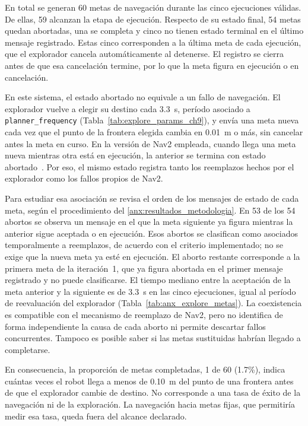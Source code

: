 En total se generan 60 metas de navegación durante las cinco ejecuciones
válidas. De ellas, 59 alcanzan la etapa de ejecución. Respecto de su estado
final, 54 metas quedan abortadas, una se completa y cinco no tienen estado
terminal en el último mensaje registrado. Estas cinco corresponden a la última
meta de cada ejecución, que el explorador cancela automáticamente al detenerse.
El registro se cierra antes de que esa cancelación termine, por lo que la meta
figura en ejecución o en cancelación.

En este sistema, el estado abortado no equivale a un fallo de navegación. El
explorador vuelve a elegir su destino cada 3.3~s, período asociado a
\texttt{planner\_frequency} (Tabla~\ref{tab:explore_params_ch9}), y envía una
meta nueva cada vez que el punto de la frontera elegida cambia en 0.01~m o más,
sin cancelar antes la meta en curso. En la versión de Nav2 empleada, cuando
llega una meta nueva mientras otra está en ejecución, la anterior se termina con
estado abortado~\citep{nav2_foxy_src}. Por eso, el mismo estado registra tanto
los reemplazos hechos por el explorador como los fallos propios de Nav2.

Para estudiar esa asociación se revisa el orden de los mensajes de estado de cada
meta, según el procedimiento del \ref{anx:resultados_metodologia}. En 53 de los
54 abortos se observa un mensaje en el que la meta siguiente ya figura
mientras la anterior sigue aceptada o en ejecución. Esos abortos se clasifican
como asociados temporalmente a reemplazos, de acuerdo con el criterio
implementado; no se exige que la nueva meta ya esté en ejecución. El
aborto restante corresponde a la primera meta de la iteración~1, que ya figura
abortada en el primer mensaje registrado y no puede clasificarse. El tiempo
mediano entre la aceptación de la meta anterior y la siguiente es de 3.3~s en las cinco
ejecuciones, igual al período de reevaluación del explorador
(Tabla~\ref{tab:anx_explore_metas}). La coexistencia es compatible con el
mecanismo de reemplazo de Nav2, pero no identifica de forma independiente la
causa de cada aborto ni permite descartar fallos concurrentes. Tampoco es
posible saber si las metas sustituidas habrían llegado a completarse.

En consecuencia, la proporción de metas completadas, 1 de 60 (1.7\%), indica
cuántas veces el robot llega a menos de 0.10~m del punto de una frontera antes
de que el explorador cambie de destino. No corresponde a una tasa de éxito de
la navegación ni de la exploración. La navegación hacia metas fijas, que
permitiría medir esa tasa, queda fuera del alcance declarado.

